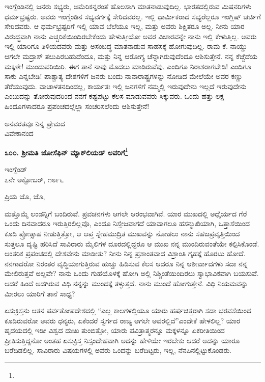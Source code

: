 ಇಂಗ್ಲೆಂಡಿನಲ್ಲಿ ಜನರು ಸಭ್ಯರು, ಅಮೆರಿಕನ್ನರಂತೆ ಹೊಲಸಾಗಿ ಮಾತನಾಡುವುದಿಲ್ಲ. ಭಾರತದಲ್ಲಿರುವ ಮಿಷನರಿಗಳು ಧರ್ಮಭ್ರಷ್ಟರು. ಅವರು ಇಂಗ್ಲೆಂಡಿನ ಸಭ್ಯವರ್ಗಕ್ಕೆ ಸೇರಿದವರಲ್ಲ. ಇಲ್ಲಿ ಧಾರ್ಮಿಕರಾದ ಸಭ್ಯರೆಲ್ಲರೂ ಇಂಗ್ಲಿಷ್ ಚರ್ಚಿಗೆ ಸೇರಿದವರು. ಆ ಧರ್ಮಭ್ರಷ್ಟರಿಗೆ ಇಲ್ಲಿ ಯಾವ ಬೆಲೆಯೂ ಇಲ್ಲ, ಮತ್ತು ಅವರು ಶಿಕ್ಷಿತರೂ ಅಲ್ಲ. ನೀನು ಯಾರ ವಿರುದ್ಧವಾಗಿ ನಾನು ಎಚ್ಚರಿಕೆಯಿಂದಿರಬೇಕೆಂದು ಹೇಳುತ್ತೀಯೋ ಅವರ ವಿಚಾರವನ್ನೇ ನಾನು ಇಲ್ಲಿ ಕೇಳುತ್ತಿಲ್ಲ. ಅವರು ಇಲ್ಲಿ ಯಾರಿಗೂ ತಿಳಿಯದವರು ಮತ್ತು ಅಸಂಬದ್ಧ ಮಾತನಾಡುವ ಸಾಹಸಕ್ಕೆ ಹೋಗುವುದಿಲ್ಲ. ರಾಮ ಕೆ. ನಾಯ್ಡು ಆಗಲೇ ಮದ್ರಾಸ್ ತಲುಪಿರಬಹುದೆಂದೂ, ಮತ್ತು ನಿನ್ನ ಆರೋಗ್ಯ ಚೆನ್ನಾಗಿರುವುದೆಂದೂ ಆಶಿಸುತ್ತೇನೆ. ನನ್ನ ಕೆಚ್ಚೆದೆಯ ಮಕ್ಕಳೇ! ಮುಂದುವರಿಯಿರಿ. ಈಗ ತಾನೆ ನಾವು ಮೊದಲು ಮಾಡಿರುವೆವು. ಎಂದಿಗೂ ನಿರಾಶರಾಗಬೇಡಿ! ಎಂದಿಗೂ ಸಾಕು ಎನ್ನಬೇಡಿ! ಪಾಶ್ಚಾತ್ಯ ದೇಶಗಳಿಗೆ ಜನರು ಬಂದು ನಾನಾರಾಷ್ಟ್ರಗಳನ್ನು ನೋಡಿದ ಮೇಲೆಯೇ ಅವರ ಕಣ್ಣು ತೆರೆಯುವುದು. ವಾಚಾಳತನದಿಂದಲ್ಲ, ಕಾರ್ಯತಃ ಇಲ್ಲಿ ಜನಗಳಿಗೆ ನಮ್ಮಲ್ಲಿ ಇರುವುದೇನು ಇಲ್ಲದೆ ಇರುವುದೇನು ಎಂಬುದನ್ನು ತೋರುವುದರಿಂದ ನನಗೆ ಕಷ್ಟಪಟ್ಟು ಕೆಲಸ ಮಾಡುವವರು ಸಿಕ್ಕುವರು. ಒಂದು ಹತ್ತು ಲಕ್ಷ ಹಿಂದೂಗಳಾದರೂ ಪ್ರಪಂಚದಲ್ಲೆಲ್ಲಾ ಸಂಚರಿಸಲೆಂದು ಆಶಿಸುತ್ತೇನೆ!

{\flushright
ಅನವರತವೂ ನಿನ್ನ ಪ್ರೇಮದ\\ವಿವೇಕಾನಂದ\par}

\begin{center}
\textbf{೩೦೦. ಶ‍್ರೀಮತಿ ಜೋಸೆಫಿನ್ ಮ್ಯಾಕ್‌ಲಿಯಡ್ ಅವರಿಗೆ}\footnote{}
\end{center}

\begin{flushright}
ಇಂಗ್ಲೆಂಡ್\\೭ನೇ ಅಕ್ಟೋಬರ್, ೧೮೯೬
\end{flushright}

\noindent
ಪ್ರಿಯ ಜೊ, ಜೊ,

ಮತ್ತೊಮ್ಮೆ ಲಂಡನ್ನಿಗೆ ಬಂದಿರುವೆ. ಪ್ರವಚನಗಳು ಆಗಲೇ ಆರಂಭವಾಗಿವೆ. ಯಾರ ಮುಖದಲ್ಲಿ ಅಧೈರ್ಯದ ಗೆರೆ ಒಂದು ದಿನವಾದರೂ ಇರುತ್ತಿರಲಿಲ್ಲವೊ, ಎಂದೂ ನಿಸ್ತೇಜವಾಗದೆ ಯಾವಾಗಲೂ ಹಸನ್ಮುಖಿಯಾಗಿ, ಒತ್ತಾಸೆಯಿಂದ ಕೂಡಿ ಪ್ರೋತ್ಸಾಹ ನೀಡುತ್ತಿತ್ತೋ, ಆ ಆಪ್ತ ಸ್ನೇಹಮುದ್ರಿತ ಮುಖವನ್ನು ನೋಡಲು ನಾನು ಸಹಜಪ್ರವೃತ್ತಿಯಿಂದ ಸುತ್ತಲೂ ದೃಷ್ಟಿ ಹರಿಸಿದೆ\enginline{-} ಸಾವಿರಾರು ಮೈಲಿಗಳ ದೂರದಲ್ಲಿದ್ದರೂ ಆ ಮುಖ ನನ್ನ ಮುಂದಿರುವಂತೆಯೇ ಕಲ್ಪಿಸಿಕೊಂಡೆ. ಆಂತರಿಕ ಪ್ರಪಂಚದಲ್ಲಿ ದೇಶವೇನು ಮಾಡೀತು? ನೀನು ನಿನ್ನ ಪ್ರಶಾಂತವಾದ ವಿಶ್ರಾಂತಿ ಗೃಹಕ್ಕೆ ಹೊರಟು ಹೋದೆ. ನನಗಾದರೋ ನಿರಂತರ ವೃದ್ಧಿಯಾಗುತ್ತಿರುವ ಹುಚ್ಚು ಹಿಡಿಸುವ ಕೆಲಸ\enginline{-} ಆದರೂ ನಿನ್ನ ಆಶೀರ್ವಾದಗಳು ಸದಾ ನನ್ನ ಮೇಲಿರುತ್ತವೆ ಅಲ್ಲವೇ? ನಾನು ಒಂದು ಗುಹೆಯೊಳಕ್ಕೆ ಹೋಗಿ ಅಲ್ಲಿ ನಿಶ್ಚಿಂತೆಯಿಂದಿರಲು ಸ್ವಾಭಾವಿಕವಾಗಿ ಬಯಸುವೆ. ಆದರೆ ಹಿಂದೆ ಅಡಗಿರುವ ವಿಧಿ ನನ್ನನ್ನು ಮುಂದಕ್ಕೆ ತಳ್ಳುತ್ತದೆ. ನಾನು ಮುಂದೆ ಹೋಗುತ್ತೇನೆ. ವಿಧಿ ನಿಯಮವನ್ನು ಮೀರಲು ಯಾರಿಗೆ ತಾನೆ ಸಾಧ್ಯ?

ಏಸುಕ್ರಿಸ್ತನು ಆತನ ಪರ್ವತೋಪದೇಶದಲ್ಲಿ “ಎಲ್ಲ ಕಾಲಗಳಲ್ಲಿಯೂ ಯಾರು ಹರ್ಷಚಿತ್ತರಾಗಿ ಸದಾ ಭರವಸೆಯಿಂದ ಕೂಡಿರುವರೋ ಅವರು ಧನ್ಯರು, ಏಕೆಂದರೆ ಸ್ವರ್ಗದ ರಾಜ್ಯ ಆಗಲೇ ಅವರಲ್ಲಿದೆ”ಎಂದೇಕೆ ಹೇಳಲಿಲ್ಲ? ಯಾರ ಹೃದಯದಲ್ಲಿ ಇಡೀ ವಿಶ್ವದ ದುಃಖ ತುಂಬಿತ್ತೋ, ಯಾರು ಪವಿತ್ರಾತ್ಮರನ್ನೂ ಮಕ್ಕಳನ್ನೂ ಏಕರೀತಿಯಿಂದ ಪ್ರೀತಿಸುತ್ತಿದ್ದನೋ ಅಂತಹ ಏಸುಕ್ರಿಸ್ತ ನಿಸ್ಸಂದೇಹವಾಗಿ ಅದನ್ನು ಹೇಳಿಯೇ ಇರಬೇಕು \enginline{-} ಆದರೆ ಅದನ್ನು ಯಾರೂ ಬರೆದಿಡಲಿಲ್ಲ. ಸಾವಿರಾರು ವಿಷಯಗಳಲ್ಲಿ ಅವರು ಒಂದನ್ನು ಬರೆದಿಟ್ಟರು, ಇಲ್ಲ, ನೆನಪಿನಲ್ಲಿಟ್ಟುಕೊಂಡರು.

